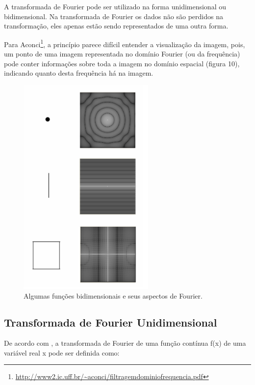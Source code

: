 \documentclass{article}
\begin{document}
    A transformada de Fourier pode ser utilizado na forma unidimensional ou bidimensional. Na transformada de Fourier os dados não são perdidos na transformação, eles apenas estão sendo representados de uma outra forma.
    
    Para Aconci\footnote{\url{http://www2.ic.uff.br/~aconci/filtragemdominiofrequencia.pdf}}, a princípio parece difícil entender a visualização da imagem, pois, um ponto de uma imagem  representada  no  domínio  Fourier  (ou  da  frequência)  pode  conter  informações  sobre toda  a  imagem  no  domínio  espacial  (figura  10),  indicando  quanto  desta  frequência  há  na  imagem.
    
     \begin{figure}[H]
        \centering
        \includegraphics[width=0.6\textwidth]{template/img/fig10.png}
        \caption{Algumas funções bidimensionais e seus aspectos de Fourier.}
        \label{fig:fig10}
    \end{figure}
    
    \subsection{Transformada de Fourier Unidimensional}
    De acordo com , a transformada de Fourier de uma função contínua f(x) de uma variável real x pode ser definida como:
    
\end{document}
